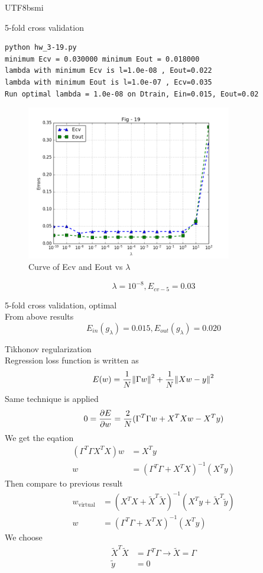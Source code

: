 \documentclass[12pt]{article}
\newenvironment{prob}[2][Prob.]{\begin{trivlist}
\item[\hskip \labelsep {\bfseries #1}\hskip \labelsep {\bfseries #2}]}{\end{trivlist}}
\begin{document}
\begin{CJK}{UTF8}{bsmi}
\begin{prob}{19} 5-fold cross validation\\
\begin{lstlisting}
python hw_3-19.py
minimum Ecv = 0.030000 minimum Eout = 0.018000
lambda with minimum Ecv is l=1.0e-08 , Eout=0.022
lambda with minimum Eout is l=1.0e-07 , Ecv=0.035
Run optimal lambda = 1.0e-08 on Dtrain, Ein=0.015, Eout=0.02
\end{lstlisting}
\begin{figure}[H]
	\centering
	\includegraphics[width=0.8\textwidth]{../results/figure_19.png}
	\caption{Curve of Ecv and Eout vs $\lambda$}
\end{figure}
\[
    \lambda = 10^{-8}, E_{cv-5} = 0.03
\]
\end{prob}

\begin{prob}{20} 5-fold cross validation, optimal\\
From above results
\[
    E_{in}(g_\lambda) = 0.015, E_{out}(g_\lambda) = 0.020
\]
\end{prob}

\begin{prob}{21} Tikhonov regularization\\
Regression loss function is written as 
\[
    E(w) = \frac{1}{N}\norm{\Gamma w}^2 + \frac{1}{N}\norm{Xw-y}^2
\]
Same technique is applied
\[
    0 = \pdv{E}{w} = \frac{2}{N} (\Gamma^T\Gamma w + X^TXw -X^Ty)
\]
We get the eqation
\begin{align*}
    (\Gamma^T\Gamma X^TX)w & = X^Ty \\
    w &= (\Gamma^T\Gamma + X^TX)^{-1}(X^Ty)
\end{align*}
Then compare to previous result
\begin{align*}
    w_{\text{virtual}} &= (X^TX + \tilde{X}^T\tilde{X})^{-1}( X^Ty + \tilde{X}^T\tilde{y}) \\
    w &= (\Gamma^T\Gamma + X^TX)^{-1}(X^Ty)
\end{align*}
We choose 
\begin{align*}
    \tilde{X}^T\tilde{X} &= \Gamma^T\Gamma \rightarrow \tilde{X} = \Gamma \\
    \tilde{y}& = 0
\end{align*}
\end{prob}


\end{CJK}
\end{document}
